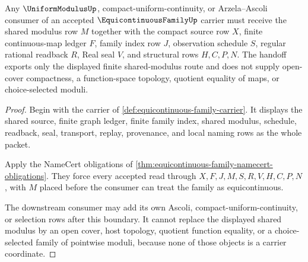 \begin{theorem}
\label{thm:equicontinuous-family-uniform-modulus-handoff}
Any $\UniformModulusUp$, compact-uniform-continuity, or Arzela--Ascoli consumer of an accepted $\EquicontinuousFamilyUp$ carrier must receive the shared modulus row $M$ together with the compact source row $X$, finite continuous-map ledger $F$, family index row $J$, observation schedule $S$, regular rational readback $R$, Real seal $V$, and structural rows $H,C,P,N$. The handoff exports only the displayed finite shared-modulus route and does not supply open-cover compactness, a function-space topology, quotient equality of maps, or choice-selected moduli.
\end{theorem}
\begin{proof}
Begin with the carrier of \autoref{def:equicontinuous-family-carrier}. It displays the shared source, finite graph ledger, finite family index, shared modulus, schedule, readback, seal, transport, replay, provenance, and local naming rows as the whole packet.

Apply the NameCert obligations of \autoref{thm:equicontinuous-family-namecert-obligations}. They force every accepted read through $X,F,J,M,S,R,V,H,C,P,N$, with $M$ placed before the consumer can treat the family as equicontinuous.

The downstream consumer may add its own Ascoli, compact-uniform-continuity, or selection rows after this boundary. It cannot replace the displayed shared modulus by an open cover, host topology, quotient function equality, or a choice-selected family of pointwise moduli, because none of those objects is a carrier coordinate.
\end{proof}

